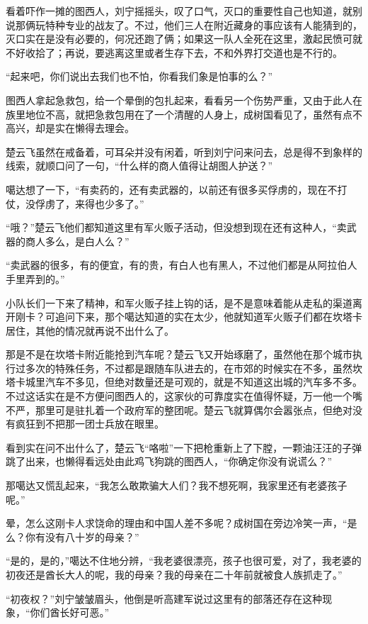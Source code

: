 看着吓作一摊的图西人，刘宁摇摇头，叹了口气，灭口的重要性自己也知道，就别说那俩玩特种专业的战友了。不过，他们三人在附近藏身的事应该有人能猜到的，灭口实在是没有必要的，何况还跑了俩；如果这一队人全死在这里，激起民愤可就不好收拾了；再说，要逃离这里或者生存下去，不和外界打交道也是不行的。

“起来吧，你们说出去我们也不怕，你看我们象是怕事的么？”

图西人拿起急救包，给一个晕倒的包扎起来，看看另一个伤势严重，又由于此人在族里地位不高，就把急救包用在了一个清醒的人身上，成树国看见了，虽然有点不高兴，却是实在懒得去理会。

楚云飞虽然在戒备着，可耳朵并没有闲着，听到刘宁问来问去，总是得不到象样的线索，就顺口问了一句，“什么样的商人值得让胡图人护送？”

噶达想了一下，“有卖药的，还有卖武器的，以前还有很多买俘虏的，现在不打仗，没俘虏了，来得也少多了。”

“哦？”楚云飞他们都知道这里有军火贩子活动，但没想到现在还有这种人，“卖武器的商人多么，是白人么？”

“卖武器的很多，有的便宜，有的贵，有白人也有黑人，不过他们都是从阿拉伯人手里弄到的。”

小队长们一下来了精神，和军火贩子挂上钩的话，是不是意味着能从走私的渠道离开刚卡？可追问下来，那个噶达知道的实在太少，他就知道军火贩子们都在坎塔卡居住，其他的情况就再说不出什么了。

那是不是在坎塔卡附近能抢到汽车呢？楚云飞又开始琢磨了，虽然他在那个城市执行过多次的特殊任务，不过都是跟随车队进去的，在市郊的时候实在不多，虽然坎塔卡城里汽车不多见，但绝对数量还是可观的，就是不知道这出城的汽车多不多。不过这话实在是不方便问图西人的，这家伙的可靠度实在值得怀疑，万一他一个嘴不严，那里可是驻扎着一个政府军的整团呢。楚云飞就算偶尔会嚣张点，但绝对没有疯狂到不把那一团士兵放在眼里。

看到实在问不出什么了，楚云飞“咯啦”一下把枪重新上了下膛，一颗油汪汪的子弹跳了出来，也懒得看远处由此鸡飞狗跳的图西人，“你确定你没有说谎么？”

那噶达又慌乱起来，“我怎么敢欺骗大人们？我不想死啊，我家里还有老婆孩子呢。”

晕，怎么这刚卡人求饶命的理由和中国人差不多呢？成树国在旁边冷笑一声，“是么？你有没有八十岁的母亲？”

“是的，是的，”噶达不住地分辨，“我老婆很漂亮，孩子也很可爱，对了，我老婆的初夜还是酋长大人的呢，我的母亲？我的母亲在二十年前就被食人族抓走了。”

“初夜权？”刘宁皱皱眉头，他倒是听高建军说过这里有的部落还存在这种现象，“你们酋长好可恶。”


